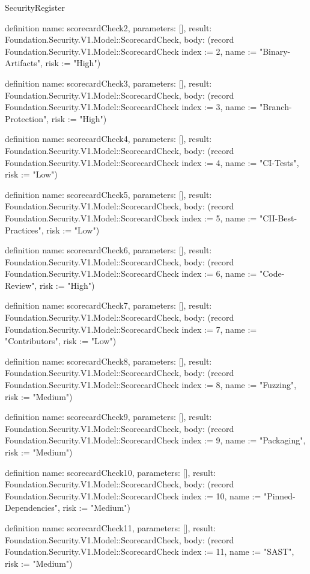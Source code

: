 \begin{lexlean}{SecurityRegister}
\begin{semanticmodule}
definition{
  name: scorecardCheck2,
  parameters: [],
  result: Foundation.Security.V1.Model::ScorecardCheck,
  body: (record Foundation.Security.V1.Model::ScorecardCheck {index := 2, name := "Binary-Artifacts", risk := "High"})
}

definition{
  name: scorecardCheck3,
  parameters: [],
  result: Foundation.Security.V1.Model::ScorecardCheck,
  body: (record Foundation.Security.V1.Model::ScorecardCheck {index := 3, name := "Branch-Protection", risk := "High"})
}

definition{
  name: scorecardCheck4,
  parameters: [],
  result: Foundation.Security.V1.Model::ScorecardCheck,
  body: (record Foundation.Security.V1.Model::ScorecardCheck {index := 4, name := "CI-Tests", risk := "Low"})
}

definition{
  name: scorecardCheck5,
  parameters: [],
  result: Foundation.Security.V1.Model::ScorecardCheck,
  body: (record Foundation.Security.V1.Model::ScorecardCheck {index := 5, name := "CII-Best-Practices", risk := "Low"})
}

definition{
  name: scorecardCheck6,
  parameters: [],
  result: Foundation.Security.V1.Model::ScorecardCheck,
  body: (record Foundation.Security.V1.Model::ScorecardCheck {index := 6, name := "Code-Review", risk := "High"})
}

definition{
  name: scorecardCheck7,
  parameters: [],
  result: Foundation.Security.V1.Model::ScorecardCheck,
  body: (record Foundation.Security.V1.Model::ScorecardCheck {index := 7, name := "Contributors", risk := "Low"})
}

definition{
  name: scorecardCheck8,
  parameters: [],
  result: Foundation.Security.V1.Model::ScorecardCheck,
  body: (record Foundation.Security.V1.Model::ScorecardCheck {index := 8, name := "Fuzzing", risk := "Medium"})
}

definition{
  name: scorecardCheck9,
  parameters: [],
  result: Foundation.Security.V1.Model::ScorecardCheck,
  body: (record Foundation.Security.V1.Model::ScorecardCheck {index := 9, name := "Packaging", risk := "Medium"})
}

definition{
  name: scorecardCheck10,
  parameters: [],
  result: Foundation.Security.V1.Model::ScorecardCheck,
  body: (record Foundation.Security.V1.Model::ScorecardCheck {index := 10, name := "Pinned-Dependencies", risk := "Medium"})
}

definition{
  name: scorecardCheck11,
  parameters: [],
  result: Foundation.Security.V1.Model::ScorecardCheck,
  body: (record Foundation.Security.V1.Model::ScorecardCheck {index := 11, name := "SAST", risk := "Medium"})
}


\end{semanticmodule}
\end{lexlean}
